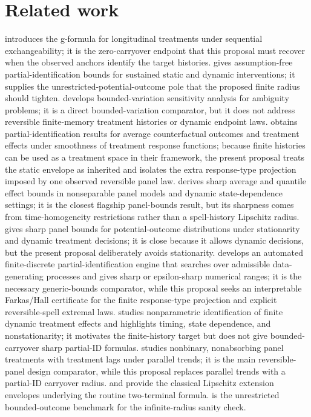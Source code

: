 \documentclass[11pt]{article}
\theoremstyle{definition}
\theoremstyle{plain}
\theoremstyle{remark}
\begin{document}
\section{Related work}
\citet{Robins1986} introduces the g-formula for longitudinal treatments under sequential exchangeability; it is the zero-carryover endpoint that this proposal must recover when the observed anchors identify the target histories.  \citet{DiemerShiSwanson2024} gives assumption-free partial-identification bounds for sustained static and dynamic interventions; it supplies the unrestricted-potential-outcome pole that the proposed finite radius should tighten.  \citet{ManskiPepper2018} develops bounded-variation sensitivity analysis for ambiguity problems; it is a direct bounded-variation comparator, but it does not address reversible finite-memory treatment histories or dynamic endpoint laws.  \citet{KimKwonKwonLee2018} obtains partial-identification results for average counterfactual outcomes and treatment effects under smoothness of treatment response functions; because finite histories can be used as a treatment space in their framework, the present proposal treats the static envelope as inherited and isolates the extra response-type projection imposed by one observed reversible panel law.  \citet{ChernozhukovFernandezValHahnNewey2013} derives sharp average and quantile effect bounds in nonseparable panel models and dynamic state-dependence settings; it is the closest flagship panel-bounds result, but its sharpness comes from time-homogeneity restrictions rather than a spell-history Lipschitz radius.  \citet{JunLeeShin2016} gives sharp panel bounds for potential-outcome distributions under stationarity and dynamic treatment decisions; it is close because it allows dynamic decisions, but the present proposal deliberately avoids stationarity.  \citet{DuarteFinkelsteinKnoxMummoloShpitser2024} develops an automated finite-discrete partial-identification engine that searches over admissible data-generating processes and gives sharp or epsilon-sharp numerical ranges; it is the necessary generic-bounds comparator, while this proposal seeks an interpretable Farkas/Hall certificate for the finite response-type projection and explicit reversible-spell extremal laws.  \citet{Han2021} studies nonparametric identification of finite dynamic treatment effects and highlights timing, state dependence, and nonstationarity; it motivates the finite-history target but does not give bounded-carryover sharp partial-ID formulas.  \citet{DeChaisemartinDHaultfoeuille2024} studies nonbinary, nonabsorbing panel treatments with treatment lags under parallel trends; it is the main reversible-panel design comparator, while this proposal replaces parallel trends with a partial-ID carryover radius.  \citet{McShane1934} and \citet{Whitney1934} provide the classical Lipschitz extension envelopes underlying the routine two-terminal formula.  \citet{Manski1990} is the unrestricted bounded-outcome benchmark for the infinite-radius sanity check.
\end{document}
